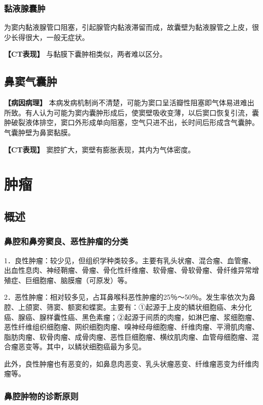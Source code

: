\subsubsection{黏液腺囊肿}

为窦内黏液腺管口阻塞，引起腺管内黏液滞留而成，故囊壁为黏液腺管之上皮，很少长得很大，一般无症状。

\textbf{【CT表现】} 与黏膜下囊肿相类似，两者难以区分。

\subsection{鼻窦气囊肿}

\textbf{【病因病理】}
本病发病机制尚不清楚，可能为窦口呈活瓣性阻塞即气体易进难出所致。有人认为可能为窦内囊肿形成后，使窦壁吸收变薄，以后窦口恢复引流，囊肿破裂液体排空，窦口外形成单向阻塞，空气只进不出，长时间后形成含气囊肿。气囊肿壁为鼻窦黏膜。

\textbf{【CT表现】} 窦腔扩大，窦壁有膨胀表现，其内为气体密度。

\section{肿瘤}

\subsection{概述}

\subsubsection{鼻腔和鼻旁窦良、恶性肿瘤的分类}

1．良性肿瘤：较少见，但组织学种类较多。主要有乳头状瘤、混合瘤、血管瘤、出血性息肉、神经鞘瘤、骨瘤、骨化性纤维瘤、软骨瘤、骨软骨瘤、骨纤维异常增殖症、巨细胞瘤、脑膜瘤（可原发）等。

2．恶性肿瘤：相对较多见，占耳鼻喉科恶性肿瘤的25％～50％。发生率依次为鼻腔、上颌窦、筛窦、额窦和蝶窦。主要有：①起源于上皮的鳞状细胞癌、未分化癌、腺癌、腺样囊性癌、黑色素瘤；②起源于间质的肉瘤，如淋巴瘤、浆细胞瘤、恶性纤维组织细胞瘤、网织细胞肉瘤、嗅神经母细胞瘤、纤维肉瘤、平滑肌肉瘤、脂肪肉瘤、软骨肉瘤、成骨肉瘤、恶性巨细胞瘤、横纹肌肉瘤、血管母细胞瘤、混合瘤恶变等。其中，以鳞状细胞癌最为多见。

此外，良性肿瘤也有恶变的，如鼻息肉恶变、乳头状瘤恶变、纤维瘤恶变为纤维肉瘤等。

\subsubsection{鼻腔肿物的诊断原则}

